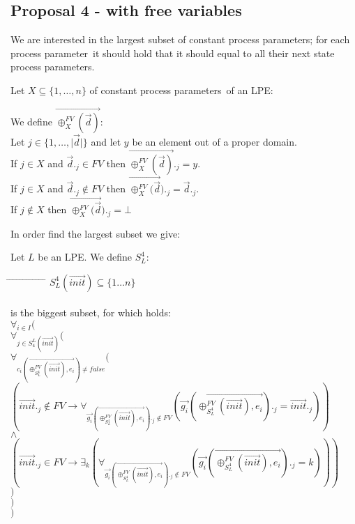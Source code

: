 \index{}\documentclass[a4paper,10pt]{article}
\theoremstyle{plain}
\theoremstyle{definition}
\newcommand{\ovr}{\overrightarrow}
\newcommand{\pp}{process parameter}
\newcommand{\pps}{process parameters}
\newcommand{\tab}{\hspace*{5.mm} \= \hspace*{5.mm} \= \hspace*{5.mm} \= \hspace*{5.mm} \= \hspace*{5.mm} \= \hspace*{5.mm}  \= \hspace*{5.mm}  \= \hspace*{5.mm}  \= \hspace*{5.mm} \= \hspace*{5.mm} \= \hspace*{5.mm}  \= \hspace*{5.mm}  \= \hspace*{5.mm}\kill}
\begin{document}
\subsection{Proposal 4 - with free variables}

We are interested in the largest subset of constant \pps ; for each \pp\ it should hold that it should equal to all their next state \pps.

Let $X \subseteq \lbrace 1, \ldots, n \rbrace$ of constant \pps\ of an LPE:

\begin{defn} We define $\ovr{\oplus_X^{FV}(\ovr{d})}$:\\
Let $j \in \lbrace 1, \dots, \vert \ovr{d} \vert \rbrace $ and let $y$ be an element out of a proper domain.\\
If $j \in X$ and $\ovr{d}._j \in FV $ then $\ovr{\oplus_X^{FV}(\ovr{d})}._j = y$. \\
If $j \in X$ and $\ovr{d}._j \not\in FV $ then $\ovr{\oplus_X^{FV}(\ovr{d}})._j = \ovr{d}._j$.\\
If $j \not\in X$ then $\ovr{\oplus_X^{FV}(\ovr{d}})._j = \bot$\\
\end{defn}

\newcommand{\z}{(\ovr{\oplus_{S_L^4}^{FV}(\ovr{init}),e_i})}

\noindent In order find the largest subset we give: %
\begin{defn} \label{def:sug4} Let $L$ be an LPE. We define $S_L^4$:
\begin{tabbing}
\tab
$ S_L^4(\ovr{init}) \subseteq \lbrace 1 \ldots n  \rbrace $ \\ \\
is the biggest subset, for which holds:\\
\> $\forall_{i \in I }($ \\ 
\> \> $\forall_{j \in S^L_4(\ovr{init})}($\\
\> \> \> $ \forall_{c_i\z \neq false}( $ \\
\> \> \> \> $(\ovr{init}._j \not\in FV \rightarrow \forall_{\ovr{g_i}\z._j \not\in FV}( \ovr{g_i}\z._j = \ovr{init}._j ))$\\
\> \> \> $\wedge$\\
\> \> \> \> $(\ovr{init}._j \in FV \rightarrow \exists_k(\forall_{\ovr{g_i}\z._j \not\in FV }(\ovr{g_i}\z._j = k))) $\\
\> \> \> $)$ \\
\> \>$)$\\
\> $)$ \\
\end{tabbing}
\end{defn}
\end{document}
